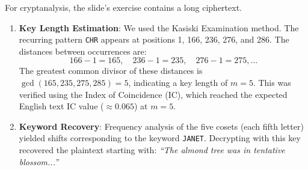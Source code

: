 \documentclass{article}
\begin{document}
For cryptanalysis, the slide's exercise contains a long ciphertext.
\begin{enumerate}
    \item \textbf{Key Length Estimation}: We used the Kasiski Examination method. The recurring pattern \texttt{CHR} appears at positions 1, 166, 236, 276, and 286. The distances between occurrences are:
    \[ 166-1=165, \quad 236-1=235, \quad 276-1=275, \dots \]
    The greatest common divisor of these distances is $\gcd(165, 235, 275, 285) = 5$, indicating a key length of $m = 5$. This was verified using the Index of Coincidence (IC), which reached the expected English text IC value ($\approx 0.065$) at $m = 5$.
    \item \textbf{Keyword Recovery}: Frequency analysis of the five cosets (each fifth letter) yielded shifts corresponding to the keyword \texttt{JANET}. Decrypting with this key recovered the plaintext starting with: \textit{``The almond tree was in tentative blossom...''}
\end{enumerate}
\end{document}
